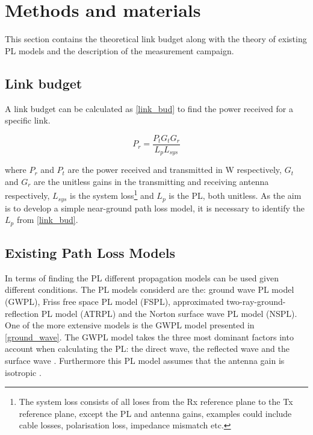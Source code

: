 \section{Methods and materials}
This section contains the theoretical link budget along with the theory of existing PL models and the description of the measurement campaign.

\subsection{Link budget}
A link budget can be calculated as \eqref{link_bud} to find the power received for a specific link.

\begin{equation}
P_{r} = \frac{P_{t}G_{t}G_{r}}{L_{p}L_{sys}}
\label{link_bud}
\end{equation}

where $P_{r}$ and $P_{t}$ are the power received and transmitted in W respectively, $G_t$ and $G_r$ are the unitless gains in the transmitting and receiving antenna respectively, $L_{sys}$ is the system loss\footnote{The system loss consists of all loses from the Rx reference plane to the Tx reference plane, except the PL and antenna gains, examples could include cable losses, polarisation loss, impedance mismatch etc.} and $L_{p}$ is the PL, both unitless. As the aim is to develop a simple near-ground path loss model, it is necessary to identify the $L_{p}$ from \eqref{link_bud}.


\subsection{Existing Path Loss Models}

In terms of finding the PL different propagation models can be used given different conditions. The PL models considerd are the: ground wave PL model (GWPL), Friss free space PL model (FSPL), approximated two-ray-ground-reflection PL model (ATRPL) and the Norton surface wave PL model (NSPL). One of the more extensive models is the GWPL model presented in \eqref{ground_wave}. The GWPL model takes the three most dominant factors into account when calculating the PL: the direct wave, the reflected wave and the surface wave \cite{Chong,Bullington}. Furthermore this PL model assumes that the antenna gain is isotropic \cite{Bullington}.  


